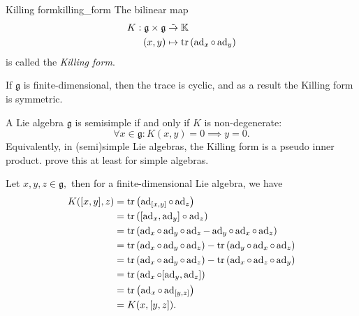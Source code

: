 \begin{definition}{Killing form}{killing_form}
    The bilinear map
    \begin{align*}
        K : \mathfrak{g} \times \mathfrak{g} &\mathrel{\tilde{\to}} \mathbb{K}\\
                                       (x,y) &\mapsto \operatorname{tr}{\left(\operatorname{ad}_{x} \circ \operatorname{ad}_{y}\right)}
    \end{align*}
    is called the \emph{Killing form}.
\end{definition}
\begin{remark}
    If \(\mathfrak{g}\) is finite-dimensional, then the trace is cyclic, and as a result the Killing form is symmetric.
\end{remark}
\begin{remark}
    A Lie algebra \(\mathfrak{g}\) is semisimple if and only if \(K\) is non-degenerate:
    \begin{equation*}
        \forall x\in \mathfrak{g} : K(x,y) = 0 \implies y = 0.
    \end{equation*}
    Equivalently, in (semi)simple Lie algebras, the Killing form is a pseudo inner product.
    \todo prove this at least for simple algebras.
\end{remark}

Let \(x,y,z \in \mathfrak{g},\) then for a finite-dimensional Lie algebra, we have
\begin{align*}
    K([x,y], z) &= \operatorname{tr}\left(\operatorname{ad}_{[x,y]}\circ\operatorname{ad}_{z}\right) \\
                &= \operatorname{tr}\left([\operatorname{ad}_{x}, \operatorname{ad}_{y}]\circ \operatorname{ad}_{z}\right)\\
                &= \operatorname{tr}\left(\operatorname{ad}_{x}\circ\operatorname{ad}_{y}\circ\operatorname{ad}_{z} - \operatorname{ad}_{y}\circ\operatorname{ad}_{x}\circ\operatorname{ad}_{z}\right)\\
                &= \operatorname{tr}\left(\operatorname{ad}_{x}\circ\operatorname{ad}_{y}\circ\operatorname{ad}_{z}\right) - \operatorname{tr}\left(\operatorname{ad}_{y}\circ\operatorname{ad}_{x}\circ\operatorname{ad}_{z}\right)\\
                &= \operatorname{tr}\left(\operatorname{ad}_{x}\circ\operatorname{ad}_{y}\circ\operatorname{ad}_{z}\right) - \operatorname{tr}\left(\operatorname{ad}_{x}\circ\operatorname{ad}_{z}\circ\operatorname{ad}_{y}\right)\\
                &= \operatorname{tr}\left(\operatorname{ad}_{x}\circ[\operatorname{ad}_{y}, \operatorname{ad}_{z}]\right)\\
                &= \operatorname{tr}\left(\operatorname{ad}_{x} \circ \operatorname{ad}_{[y,z]}\right)\\
                &= K(x, [y,z]).
\end{align*}

